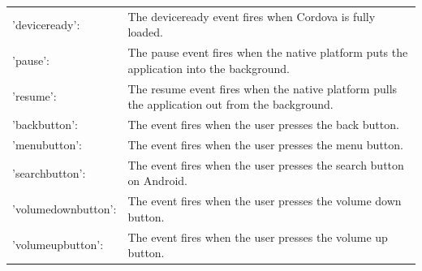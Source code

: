 \begin{tabularx}{\textwidth}{lX}
'deviceready':& The deviceready event fires when Cordova is fully loaded.\\
'pause': & The pause event fires when the native platform puts the application into the background.\\
'resume':& The resume event fires when the native platform pulls the application out from the background.\\
'backbutton':& The event fires when the user presses the back button.\\
'menubutton':& The event fires when the user presses the menu button. \\
'searchbutton':& The event fires when the user presses the search button on Android. \\
'volumedownbutton':& The event fires when the user presses the volume down button.\\
'volumeupbutton':& The event fires when the user presses the volume up button.\\
\end{tabularx}




